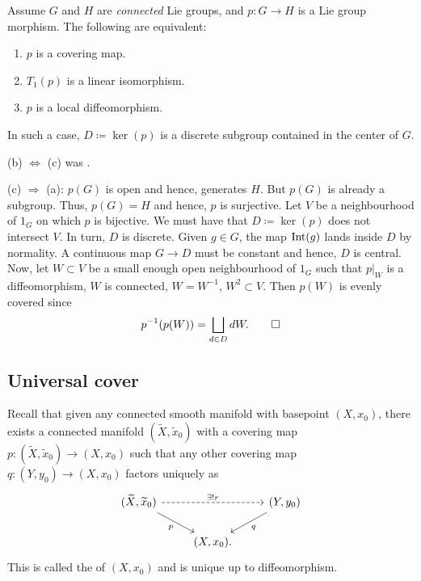 \documentclass[12pt]{article}
\begin{document}
\begin{lem} \label{lem:covering-local-diffeo-equivalent}
	Assume $G$ and $H$ are \emph{connected} Lie groups, and $p \colon G \to H$ is a Lie group morphism. The following are equivalent:
	\begin{enumerate}[label=(\alph*)]
		\item $p$ is a covering map.
		\item $T_{1}(p)$ is a linear isomorphism.
		\item $p$ is a local diffeomorphism.
	\end{enumerate}
	In such a case, $D \coloneqq \ker(p)$ is a discrete subgroup contained in the center of $G$.
\end{lem}
\begin{sketch}
	(b) $\Leftrightarrow$ (c) was .

	(c) $\Rightarrow$ (a): $p(G)$ is open and hence, generates $H$. 
	But $p(G)$ is already a subgroup. 
	Thus, $p(G) = H$ and hence, $p$ is surjective. 
	Let $V$ be a neighbourhood of $1_{G}$ on which $p$ is bijective.
	We must have that $D \coloneqq \ker(p)$ does not intersect $V$. 
	In turn, $D$ is discrete. \newline
	Given $g \in G$, the map $\operatorname{Int}(g)$ lands inside $D$ by normality. 
	A continuous map $G \to D$ must be constant and hence, $D$ is central. \newline
	Now, let $W \subset V$ be a small enough open neighbourhood of $1_{G}$ such that $p|_{W}$ is a diffeomorphism, $W$ is connected, $W = W^{-1}$, $W^{2} \subset V$. 
	Then $p(W)$ is evenly covered since
	\begin{equation*} 
		p^{-1}(p(W)) = \bigsqcup_{d \in D} dW. \qedhere
	\end{equation*}
\end{sketch}

\subsection{Universal cover}

Recall that given any connected smooth manifold with basepoint $(X, x_{0})$, 
there exists a connected manifold $(\widetilde{X}, \widetilde{x}_{0})$ 
with a covering map $p \colon (\widetilde{X}, \widetilde{x}_{0}) \to (X, x_{0})$ 
such that any other covering map $q \colon (Y, y_{0}) \to (X, x_{0})$ factors uniquely as
\begin{equation*} 
	\begin{tikzcd}
		{(\widetilde{X}, \widetilde{x}_{0})} \arrow[rd, "p"'] \arrow[rr, "\exists!r", dashed] & & {(Y, y_{0})} \arrow[ld, "q"] \\
		& {(X, x_{0}).} &                             
	\end{tikzcd}
\end{equation*}
This is called the  of $(X, x_{0})$ and is unique up to diffeomorphism.
\end{document}
